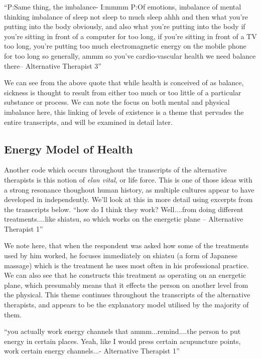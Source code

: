``P:Same thing, the imbalance-
I:mmmm
P:Of emotions, imbalance of mental thinking imbalance of sleep not sleep to much sleep ahhh and then what you're putting into the body obviously, and also what you're putting into the body if you're sitting in front of a computer for too long, if you're sitting in front of a TV too long, you're putting too much electromagnetic energy on the mobile phone for too long so generally, ammm so you've cardio-vascular health we need balance there-- Alternative Therapist 3''

We can see from the above quote that while health is conceived of as balance, sickness is thought to result from either too much or too little of a particular substance or process. We can note the focus on both mental and physical imbalance here, this linking of levels of existence is a theme that pervades the entire transcripts, and  will be examined in detail later. 

\subsection{Energy Model of Health}

Another code which occurs throughout the transcripts of the alternative therapists is this notion of \textit{elan vital}, or life force. This is one of those ideas with a strong resonance thoughout human history, as multiple cultures appear to have developed in independently. We'll look at this in more detail using excerpts from the transcripts below. 
``how do I think they work? Well....from doing different treatments....like shiatsu, so which works on the energetic plane – Alternative Therapist 1''

We note here, that when the respondent was asked how some of the treatments used by him worked, he focuses immediately on shiatsu (a form of Japanese massage) which is the treatment he uses most often in his professional practice. We can also see that he constructs this treatment as operating on an energetic plane, which presumably means that it effects the person on another level from the physical. This theme continues throughout the transcripts of the alternative therapists, and appears to be the explanatory model utilised by the majority of them. 

``you actually work energy channels that ammm...remind....the person to put energy in certain places. Yeah, like I would press certain acupuncture points, work certain energy channels...- Alternative Therapist 1''

